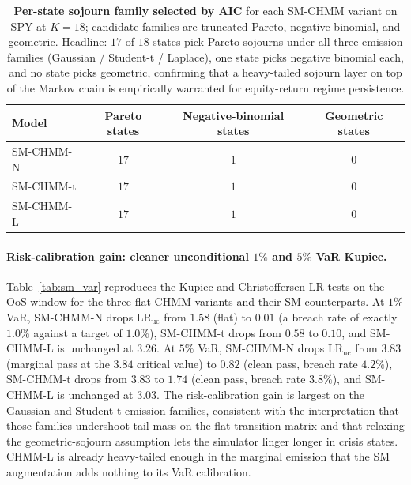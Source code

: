 \begin{table}[t]
\centering
\small
\caption{\textbf{Per-state sojourn family selected by AIC} for each SM-CHMM variant on SPY at $K = 18$; candidate families are truncated Pareto, negative binomial, and geometric. Headline: $17$ of $18$ states pick Pareto sojourns under all three emission families (Gaussian / Student-t / Laplace), one state picks negative binomial each, and no state picks geometric, confirming that a heavy-tailed sojourn layer on top of the Markov chain is empirically warranted for equity-return regime persistence.}
\label{tab:sm_sojourn}
\begin{tabular}{lccc}
\toprule
Model & Pareto states & Negative-binomial states & Geometric states \\
\midrule
SM-CHMM-N & $17$ & $1$ & $0$ \\
SM-CHMM-t & $17$ & $1$ & $0$ \\
SM-CHMM-L & $17$ & $1$ & $0$ \\
\bottomrule
\end{tabular}
\end{table}

\paragraph{Risk-calibration gain: cleaner unconditional $1\%$ and $5\%$ VaR Kupiec.}
Table~\ref{tab:sm_var} reproduces the Kupiec and Christoffersen LR tests on the OoS window for the three flat CHMM variants and their SM counterparts.
At $1\%$ VaR, SM-CHMM-N drops $\text{LR}_{\text{uc}}$ from $1.58$ (flat) to $0.01$ (a breach rate of exactly $1.0\%$ against a target of $1.0\%$), SM-CHMM-t drops from $0.58$ to $0.10$, and SM-CHMM-L is unchanged at $3.26$.
At $5\%$ VaR, SM-CHMM-N drops $\text{LR}_{\text{uc}}$ from $3.83$ (marginal pass at the $3.84$ critical value) to $0.82$ (clean pass, breach rate $4.2\%$), SM-CHMM-t drops from $3.83$ to $1.74$ (clean pass, breach rate $3.8\%$), and SM-CHMM-L is unchanged at $3.03$.
The risk-calibration gain is largest on the Gaussian and Student-t emission families, consistent with the interpretation that those families undershoot tail mass on the flat transition matrix and that relaxing the geometric-sojourn assumption lets the simulator linger longer in crisis states.
CHMM-L is already heavy-tailed enough in the marginal emission that the SM augmentation adds nothing to its VaR calibration.

